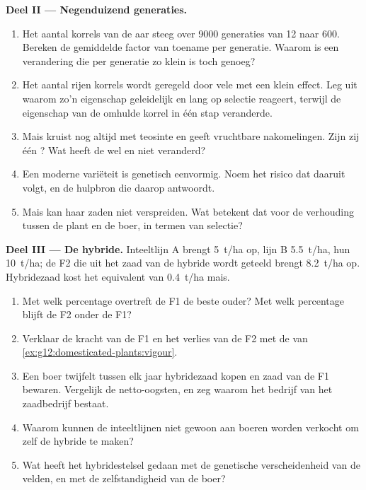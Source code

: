 \begin{problem}
\medskip
\noindent\textbf{Deel II --- Negenduizend generaties.}
\begin{enumerate}[resume]
  \item Het aantal korrels van de aar steeg over 9000 generaties van 12
        naar 600. Bereken de gemiddelde factor van toename per generatie.
        Waarom is een verandering die per generatie zo klein is toch
        genoeg?
  \item Het aantal rijen korrels wordt geregeld door vele  met een
        klein effect. Leg uit waarom zo'n eigenschap geleidelijk en lang
        op selectie reageert, terwijl de eigenschap van de omhulde korrel
        in één stap veranderde.
  \item Mais kruist nog altijd met teosinte en geeft vruchtbare
        nakomelingen. Zijn zij één ? Wat heeft de  wel
        en niet veranderd?
  \item Een moderne variëteit is genetisch eenvormig. Noem het risico dat
        daaruit volgt, en de hulpbron die daarop antwoordt.
  \item Mais kan haar zaden niet verspreiden. Wat betekent dat voor de
        verhouding tussen de plant en de boer, in termen van selectie?
\end{enumerate}

\medskip
\noindent\textbf{Deel III --- De hybride.}
Inteeltlijn A brengt \qty{5}{t/ha} op, lijn B \qty{5.5}{t/ha}, hun
 \qty{10}{t/ha}; de F2 die uit het zaad van de hybride wordt
geteeld brengt \qty{8.2}{t/ha} op. Hybridezaad kost het equivalent van
\qty{0.4}{t/ha} mais.
\begin{enumerate}[resume]
  \item Met welk percentage overtreft de F1 de beste ouder? Met welk
        percentage blijft de F2 onder de F1?
  \item Verklaar de kracht van de F1 en het verlies van de F2 met de
         van \cref{ex:g12:domesticated-plants:vigour}.
  \item Een boer twijfelt tussen elk jaar hybridezaad kopen en zaad van
        de F1 bewaren. Vergelijk de netto-oogsten, en zeg waarom het
        bedrijf van het zaadbedrijf bestaat.
  \item Waarom kunnen de inteeltlijnen niet gewoon aan boeren worden
        verkocht om zelf de hybride te maken?
  \item Wat heeft het hybridestelsel gedaan met de genetische
        verscheidenheid van de velden, en met de zelfstandigheid van de
        boer?
\end{enumerate}


\end{problem}
